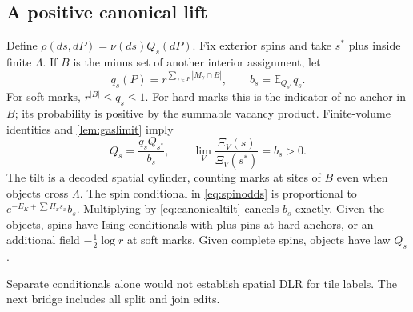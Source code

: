 \documentclass[11pt,reqno]{amsart}
\numberwithin{equation}{section}
\theoremstyle{definition}
\theoremstyle{remark}
\newcommand{\E}{\mathbb E}
\begin{document}
\subsection{A positive canonical lift}\label{sec:canonical}
Define $\rho(ds,dP)=\nu(ds)Q_s(dP)$. Fix exterior spins and take $s^*$ plus inside finite $\Lambda$. If $B$ is the minus set of another interior assignment, let
\[
 q_s(P)=r^{\sum_{\gamma\in P}|M_\gamma\cap B|},\qquad b_s=\E_{Q_{s^*}}q_s.
\]
For soft marks, $r^{|B|}\leq q_s\leq1$. For hard marks this is the indicator of no anchor in $B$; its probability is positive by the summable vacancy product. Finite-volume identities and \cref{lem:gaslimit} imply
\begin{equation}\label{eq:canonicaltilt}
 Q_s=\frac{q_sQ_{s^*}}{b_s},\qquad
 \lim_V\frac{\Xi_V(s)}{\Xi_V(s^*)}=b_s>0.
\end{equation}
The tilt is a decoded spatial cylinder, counting marks at sites of $B$ even when objects cross $\Lambda$. The spin conditional in \eqref{eq:spinodds} is proportional to $e^{-E_K+\sum H_xs_x}b_s$. Multiplying by \eqref{eq:canonicaltilt} cancels $b_s$ exactly. Given the objects, spins have Ising conditionals with plus pins at hard anchors, or an additional field $-\frac12\log r$ at soft marks. Given complete spins, objects have law $Q_s$.

Separate conditionals alone would not establish spatial DLR for tile labels. The next bridge includes all split and join edits.
\end{document}
